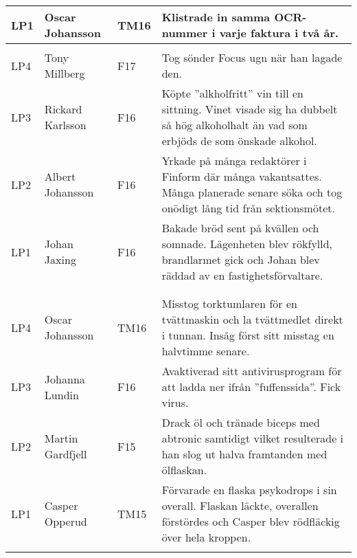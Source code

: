 \documentclass[a4paper]{article}
\begin{document}
\begin{longtable}{p{5mm}>{\raggedright\arraybackslash}p{30mm}p{10mm}p{108mm}}
LP1 & Oscar Johansson & TM16 & Klistrade in samma OCR-nummer i varje faktura i två år. \\ \hline

\rowcolor{veryLightGray} \multicolumn{4}{l}{\textbf{2017/2018}} \\ \hline

LP4 & Tony Millberg & F17 & Tog sönder Focus ugn när han lagade den. \\ \hline

LP3 & Rickard Karlsson & F16 & Köpte ''alkholfritt'' vin till en sittning. Vinet visade sig ha dubbelt så hög alkoholhalt än vad som erbjöds de som önskade alkohol. \\ \hline

LP2 & Albert Johansson & F16 & Yrkade på många redaktörer i Finform där många vakantsattes. Många planerade senare söka och tog onödigt lång tid från sektionsmötet. \\ \hline 

LP1 & Johan Jaxing & F16 & Bakade bröd sent på kvällen och somnade. Lägenheten blev rökfylld, brandlarmet gick och Johan blev räddad av en fastighetsförvaltare. \\ \hline
\\ \hline %
\rowcolor{veryLightGray} \multicolumn{4}{l}{\textbf{2016/2017}} \\ \hline

LP4 & Oscar Johansson & TM16 & Misstog torktumlaren för en tvättmaskin och la tvättmedlet direkt i tunnan. Insåg först sitt misstag en halvtimme senare.\\ \hline

LP3 & Johanna Lundin & F16 & Avaktiverad sitt antivirusprogram för att ladda ner ifrån ''fuffenssida''. Fick virus. \\ \hline

LP2 & Martin Gardfjell & F15 & Drack öl och tränade biceps med abtronic samtidigt vilket resulterade i han slog ut halva framtanden med ölflaskan.\\ \hline

LP1 & Casper Opperud & TM15 & Förvarade en flaska psykodrops i sin overall. Flaskan läckte, overallen förstördes och Casper blev rödfläckig över hela kroppen.\\ \hline

\rowcolor{veryLightGray} \multicolumn{4}{l}{\textbf{2015/2016}} \\ \hline


\end{longtable}
\end{document}

